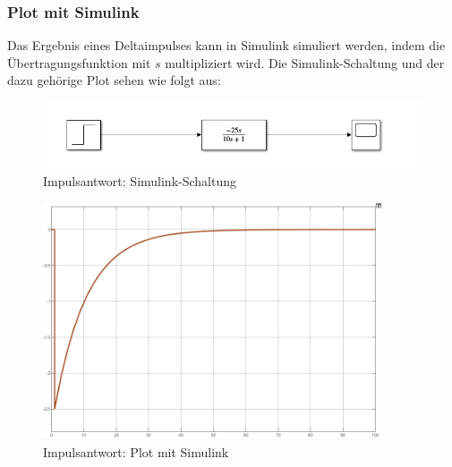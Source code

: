 \subsubsection{Plot mit Simulink}
Das Ergebnis eines Deltaimpulses kann in Simulink simuliert werden, indem die Übertragungsfunktion mit $s$ multipliziert wird. Die Simulink-Schaltung und der dazu gehörige Plot sehen wie folgt aus:
\begin{figure}[H]
    \centering
    \includegraphics[width=12cm]{images_2/Gewichtsfunktion/impuls_simulink_schaltung.png}
    \caption{Impulsantwort: Simulink-Schaltung}
\end{figure}
\begin{figure}[H]
    \centering
    \includegraphics[width=10cm]{images_2/Gewichtsfunktion/impulsantwort_simulink.png}
    \caption{Impulsantwort: Plot mit Simulink}
\end{figure}
